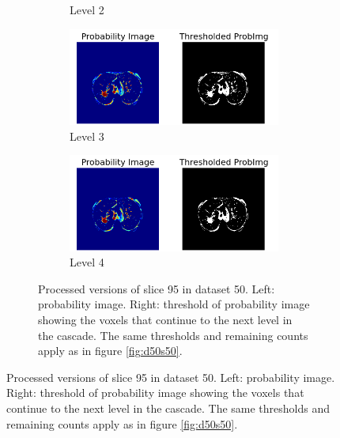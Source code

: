 \begin{figure}[p]
\begin{center}
\begin{subfigure}[b]{0.5\linewidth}
\begin{subfigure}[b]{\linewidth}
			\caption{Level 2}
		\end{subfigure}
		\begin{subfigure}[b]{\linewidth}
			\includegraphics[width=\linewidth]{img/cascades/D50L3S95.png}
			\caption{Level 3}
		\end{subfigure}
		\begin{subfigure}[b]{\linewidth}
			\includegraphics[width=\linewidth]{img/cascades/D50L4S95.png}
			\caption{Level 4}
		\end{subfigure}
	  \caption{Processed versions of slice 95 in dataset 50. Left: probability
	  image. Right: threshold of probability image showing the voxels that continue
	  to the next level in the cascade. The same thresholds and remaining counts
	  apply as in figure \ref{fig:d50s50}.}
	  \label{fig:d50s95}
  \end{subfigure}
\end{center}
\end{figure}

